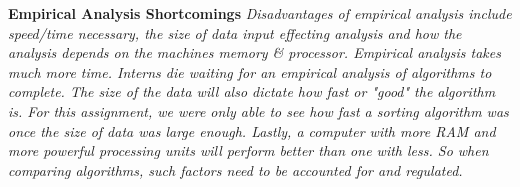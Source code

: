 \begin{tcolorbox}
\textbf{
    Empirical Analysis Shortcomings
}
\textit{
Disadvantages of empirical analysis include speed/time necessary, the size of data input effecting analysis and how the analysis depends on the machines memory & processor. Empirical analysis takes much more time. Interns die waiting for an empirical analysis of algorithms to complete. The size of the data will also dictate how fast or "good" the algorithm is. For this assignment, we were only able to see how fast a sorting algorithm was once the size of data was large enough. Lastly, a computer with more RAM and more powerful processing units will perform better than one with less. So when comparing algorithms, such factors need to be accounted for and regulated.
}
\end{tcolorbox}
